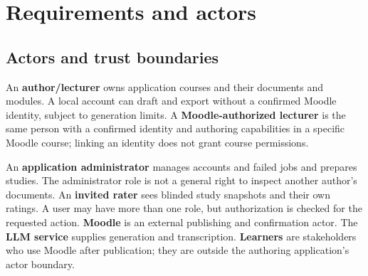 \clearpage\section{Requirements and actors}\label{sec:requirements}
\subsection{Actors and trust boundaries}
An \textbf{author/lecturer} owns application courses and their documents and modules. A local account can draft and export without a confirmed Moodle identity, subject to generation limits. A \textbf{Moodle-authorized lecturer} is the same person with a confirmed identity and authoring capabilities in a specific Moodle course; linking an identity does not grant course permissions.

An \textbf{application administrator} manages accounts and failed jobs and prepares studies. The administrator role is not a general right to inspect another author's documents. An \textbf{invited rater} sees blinded study snapshots and their own ratings. A user may have more than one role, but authorization is checked for the requested action. \textbf{Moodle} is an external publishing and confirmation actor. The \textbf{LLM service} supplies generation and transcription. \textbf{Learners} are stakeholders who use Moodle after publication; they are outside the authoring application's actor boundary.
